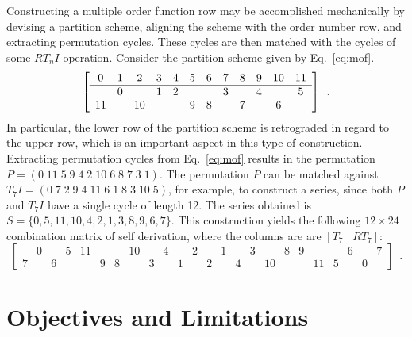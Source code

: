 \begin{example}
	\cite[241, 247]{Morris1977}
	\label{ex:mof}
	Constructing a multiple order function row may be accomplished mechanically by devising a partition scheme, aligning the scheme with the order number row, and extracting permutation cycles. These cycles are then matched with the cycles of some $RT_nI$ operation. Consider the partition scheme given by Eq.~\ref{eq:mof}.
	\newpage
	\begin{equation}
		\label{eq:mof}
		\left[
        \begin{array}{cccccccccccc}
            0  & 1 & 2  & 3 & 4 & 5 & 6 & 7 & 8 & 9 & 10 & 11 \\
            \hline
               & 0 &    & 1 & 2 &   &   & 3 &   & 4 &    & 5  \\
            11 &   & 10 &   &   & 9 & 8 &   & 7 &   & 6  &
        \end{array}
        \right] \enspace.
	\end{equation}
	\noindent In particular, the lower row of the partition scheme is retrograded in regard to the upper row, which is an important aspect in this type of construction. Extracting permutation cycles from Eq.~\ref{eq:mof} results in the permutation $P = (0 \; 11 \; 5 \; 9 \; 4 \; 2 \; 10 \; 6 \; 8 \; 7 \; 3 \; 1)$. The permutation $P$ can be matched against $T_7I = (0 \; 7 \; 2 \; 9 \; 4 \; 11 \; 6 \; 1 \; 8 \; 3 \; 10 \; 5)$, for example, to construct a series, since both $P$ and $T_7I$ have a single cycle of length 12. The series obtained is $S = \{0, 5, 11, 10, 4, 2, 1, 3, 8, 9, 6, 7\}$. This construction yields the following $12 \times 24$ combination matrix of self derivation, where the columns are are $[T_7 \; | \; RT_7]$:
	\begin{equation}
		\left[
        \begin{array}{cccccccccccc|cccccccccccc}
        & 0 && 5 & 11 &&& 10 && 4 && 2 && 1 && 3 && 8 & 9 &&& 6 && 7 \\
        7 && 6 &&& 9 & 8 && 3 && 1 && 2 && 4 && 10 &&& 11 & 5 && 0 &
        \end{array}
        \right] \enspace.
	\end{equation}
\end{example}

\section{Objectives and Limitations}

